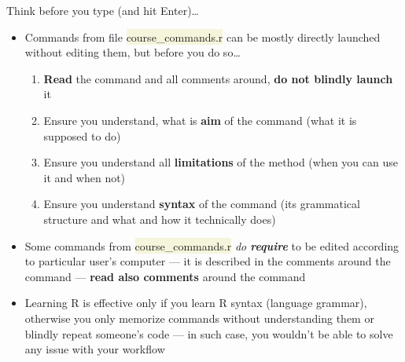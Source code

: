 \documentclass[compress, ucs, xelatex, 11pt, xcolor=svgnames, aspectratio=169,
	hyperref={
		bookmarks=true,
		unicode=true,
		colorlinks=true,
		pdftitle={Molecular data in R},
		plainpages=false,
		pdfauthor={Vojtech Zeisek},
		pdfsubject={Course about phylogeny and evolution in R},
		pdfcreator={XeLaTeX},
		pdfkeywords={R, evolution, phylogeny, molecular data},
		linkcolor=Crimson, %
		anchorcolor=Magenta, %
		citecolor=Magenta, %
		filecolor=Magenta, %
		menucolor=Magenta, %
		urlcolor=DodgerBlue, %
		pdftex},
	url={hyphens, lowtilde} %
	]{beamer}
\renewcommand{\texttt}[1]{\colorbox{Beige}{{\ttfamily #1}}}
\begin{document}
\begin{frame}{Think before you type (and hit Enter)\ldots}
	\begin{itemize}
		\item Commands from file \texttt{course\_commands.r} can be mostly directly launched without editing them, but before you do so\ldots
		\begin{enumerate}
			\item \textbf{Read} the command and all comments around, \textbf{do not blindly launch} it
			\item Ensure you understand, what is \textbf{aim} of the command (what it is supposed to do)
			\item Ensure you understand all \textbf{limitations} of the method (when you can use it and when not)
			\item Ensure you understand \textbf{syntax} of the command (its grammatical structure and what and how it technically does)
		\end{enumerate}
		\item Some \alert{commands} from \texttt{course\_commands.r} \alert{\textit{do \textbf{require}} to be edited} according to particular user's computer --- it is described in the comments around the command --- \textbf{read also comments} around the command
		\item Learning R is effective only if you learn R syntax (language grammar), otherwise you only memorize commands without understanding them or blindly repeat someone's code --- in such case, you wouldn't be able to solve any issue with your workflow
	\end{itemize}
\end{frame}
\end{document}
